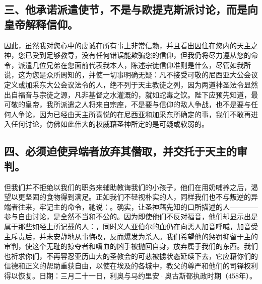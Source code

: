 
\subsection{三、他承诺派遣使节，不是与欧提克斯派讨论，而是向皇帝解释信仰。}

因此，虽然我对您心中的虔诚在所有事上非常信赖，并且看出因住在您内的天主之神，您已受到足够教导，没有任何错误能欺骗您的信仰，但我仍将尽力遵从您的命令，派遣几位兄弟在您面前代表我本人，陈述宗徒信仰准则是什么，尽管如我所说，这为您是众所周知的，并使一切事明确无疑：凡不接受可敬的尼西亚大公会议定义或加采东大公会议法令的人，绝不列于天主教徒之列，因为两道神圣法令显然出自福音与宗徒之源，凡非基督之水灌溉的，就如蛇毒之饮。陛下应预先知道，最可敬的皇帝，我所派遣之人将来自宗座，不是要与信仰的敌人争战，也不是要与任何人争论，因为已经由天主所喜悦的在尼西亚和加采东所确定的事，我们不敢再进入任何讨论，仿佛如此伟大的权威藉圣神所定的是可疑或软弱的。\par


\subsection{四、必须迫使异端者放弃其僭取，并交托于天主的审判。}

但我们并不拒绝以我们的职务来辅助教诲我们的小孩子，他们在用奶哺养之后，渴望以更坚固的食物得到满足。正如我们不轻视朴实的人，同样我们也不与叛逆的异端者往来，牢记主的命令，祂说：。确实，让圣神藉先知的口所描述的人————参与自由讨论，是全然不当和不公的。因为即使他们不反对福音，他们却显示出是属于那些如经上所记载的人：，同时义人亚伯尔的血仍在向恶人加音呼喊，加音受主斥责后，并未安静地从事悔改，反而爆发为杀人。我们希望他的惩罚抑留于主的审判，使这个无耻的掠夺者和嗜血的凶手被抛回自身，放弃属于我们的东西。我们也祈求你们，不再容忍亚历山大的圣教会的可悲被掳状态延续下去，它应藉你们的信德和正义的帮助重获自由，以使在埃及的各城中，教父的尊严和他们的司铎权利得以恢复。日期：三月二十一日，利奥与马约里安·奥古斯都执政时期（458年）。\par


